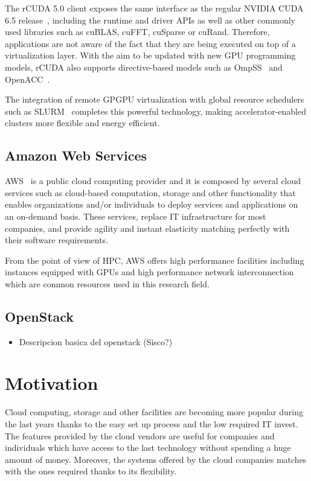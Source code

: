 \documentclass[a4paper,twoside]{article}
\begin{document}
The {rCUDA} 5.0 client exposes the same interface as the regular NVIDIA
CUDA 6.5 release~\cite{cuda65}, including the runtime and driver
APIs as well as other commonly used libraries such as cuBLAS, cuFFT, cuSparse or cuRand.
Therefore, applications are not aware of the fact that they are being executed
on top of a virtualization layer.
With the aim to be updated with new GPU programming models, {rCUDA} also supports
directive-based models such as OmpSS~\cite{repara15} and OpenACC~\cite{cluster15}.

The integration of remote GPGPU virtualization with global
resource schedulers such as SLURM~\cite{sbacpad14} completes this powerful
technology, making accelerator-enabled clusters more flexible and
energy efficient.

\subsection{Amazon Web Services}
\label{sec:aws}
AWS~\cite{aws} is a public cloud computing provider
and it is composed by several cloud services such as 
 cloud-based computation, storage and other functionality 
that enables organizations and/or individuals to deploy
services and applications on an on-demand basis. 
These services, replace IT infrastructure for most companies, and provide agility and instant elasticity matching 
perfectly with their software requirements.

From the point of view of HPC, AWS offers high performance facilities including 
instances equipped with GPUs and high performance network interconnection which 
are common resources used in this research field.

\subsection{OpenStack}
\label{sec:openstack}
\begin{itemize}
\item Descripcion basica del openstack (Sisco?)
\end{itemize}

\section{Motivation}
\label{sec:motivation}

Cloud computing, storage and other facilities are becoming 
more popular during the last years thanks to the easy set up 
process and the low required IT invest. The features provided 
by the cloud vendors are useful for companies and individuals 
which have access to the last technology without spending a 
huge amount of money. Moreover, the systems offered by the cloud 
companies matches with the ones required thanks to its flexibility.
\end{document}
